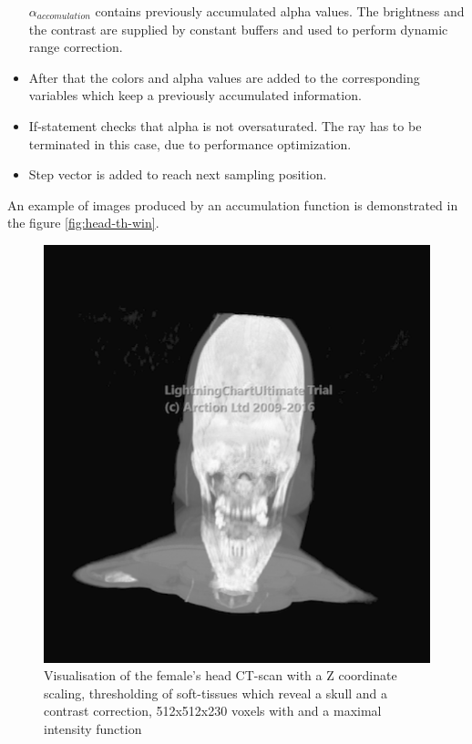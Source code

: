 \documentclass[twoside, english, 11pt]{report}
\begin{document}
\begin{itemize}
$\alpha_{accomulation}$ contains previously accumulated alpha values. The brightness and the contrast are supplied by constant buffers and used to perform dynamic range correction.
\item After that the colors and alpha values are added to the corresponding variables which keep a previously accumulated information.
\item If-statement checks that alpha is not oversaturated. The ray has to be terminated in this case, due to performance optimization.
\item Step vector is added to reach next sampling position.
\end{itemize}

An example of images produced by an accumulation function is demonstrated in the figure \ref{fig:head-th-win}. \\

\begin{figure}[!h]
\centerline{\includegraphics[scale = 0.45]{img/maxi}}
\caption{Visualisation of the female's head CT-scan with a Z coordinate scaling, thresholding of soft-tissues which reveal a skull and a contrast correction, 512x512x230 voxels with and a maximal intensity function\label{fig:maxi}}
\end{figure}
\end{document}
